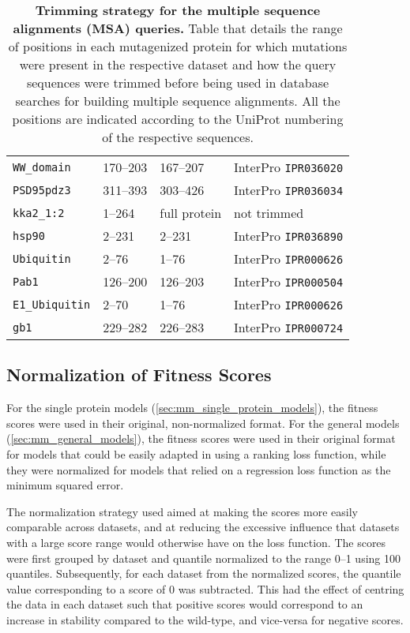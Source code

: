 \begin{table}[p]
{\begin{tabular*}{\linewidth}{@{\extracolsep{\fill}}llll}
			\texttt{WW\_domain}     & \numrange{170}{203} & \numrange{167}{207} & InterPro \texttt{IPR036020} \\
			\texttt{PSD95pdz3}      & \numrange{311}{393} & \numrange{303}{426} & InterPro \texttt{IPR036034} \\
			\texttt{kka2\_1:2}      & \numrange{1}{264}   & full protein        & not trimmed                 \\
			\texttt{hsp90}          & \numrange{2}{231}   & \numrange{2}{231}   & InterPro \texttt{IPR036890} \\
			\texttt{Ubiquitin}      & \numrange{2}{76}    & \numrange{1}{76}    & InterPro \texttt{IPR000626} \\
			\texttt{Pab1}           & \numrange{126}{200} & \numrange{126}{203} & InterPro \texttt{IPR000504} \\
			\texttt{E1\_Ubiquitin}  & \numrange{2}{70}    & \numrange{1}{76}    & InterPro \texttt{IPR000626} \\
			\texttt{gb1}            & \numrange{229}{282} & \numrange{226}{283} & InterPro \texttt{IPR000724} \\
			\bottomrule
		\end{tabular*}%
	}%
	{\caption[Trimming strategy for the multiple sequence alignments queries]{%
			\textbf{Trimming strategy for the multiple sequence alignments (MSA) queries.}
			Table that details the range of positions in each mutagenized protein for which mutations were present in the respective dataset and how the query sequences were trimmed before being used in database searches for building multiple sequence alignments.
			All the positions are indicated according to the UniProt numbering of the respective sequences.
		}\label{tab:mut_range}%
	}%
\end{table}

\subsection{Normalization of Fitness Scores}\label{sec:mm_quantile_norm}
For the single protein models (\cref{sec:mm_single_protein_models}), the fitness scores were used in their original, non-normalized format.
For the general models (\cref{sec:mm_general_models}), the fitness scores were used in their original format for models that could be easily adapted in using a ranking loss function, while they were normalized for models that relied on a regression loss function as the minimum squared error.

The normalization strategy used aimed at making the scores more easily comparable across datasets, and at reducing the excessive influence that datasets with a large score range would otherwise have on the loss function.
The scores were first grouped by dataset and quantile normalized to the range \numrange{0}{1} using \num{100} quantiles.
Subsequently, for each dataset from the normalized scores, the quantile value corresponding to a score of \num{0} was subtracted.
This had the effect of centring the data in each dataset such that positive scores would correspond to an increase in stability compared to the wild-type, and vice-versa for negative scores.

